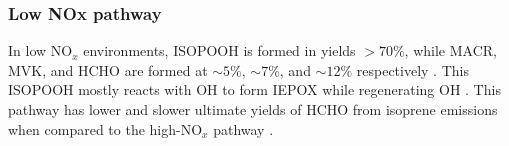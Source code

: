       
      
    
    \subsubsection{Low NOx pathway}
      
      In low NO$_x$ environments, ISOPOOH is formed in yields $> 70\%$, while MACR, MVK, and HCHO are formed at $\sim 5\%$, $\sim 7\%$, and $\sim 12\%$ respectively \parencite{Paulot2009b,Mao2013}.
      This ISOPOOH mostly reacts with OH to form IEPOX while regenerating OH \parencite{Mao2013}.
      This pathway has lower and slower ultimate yields of HCHO from isoprene emissions when compared to the high-NO$_x$ pathway \parencite{Palmer2006}.
      
